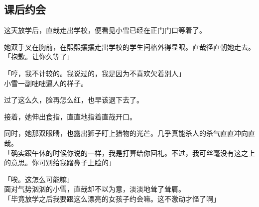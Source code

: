 \subsection{课后约会}

这天放学后，直哉走出学校，便看见小雪已经在正门门口等着了。

她双手叉在胸前，在熙熙攘攘走出学校的学生间格外得显眼。直哉径直朝她走去。\\

「抱歉。让你久等了」

「哼，我不计较的。我说过的，我是因为不喜欢欠着别人」\\

小雪一副咄咄逼人的样子。

过了这么久，脸再怎么红，也早该退下去了。

接着，她伸出食指，直直地指着直哉开口。

同时，她那双眼睛，也露出狮子盯上猎物的光芒。几乎真能杀人的杀气直直冲向直哉。\\

「确实跟午休的时候你说的一样，我是打算给你回礼。不过，我可丝毫没有这之上的意思。你可别给我蹭鼻子上脸的」

「唉。这怎么可能嘛」\\

面对气势汹汹的小雪，直哉却不以为意，淡淡地耸了耸肩。\\

「毕竟放学之后我要跟这么漂亮的女孩子约会嘛。这不激动才怪了啊」

